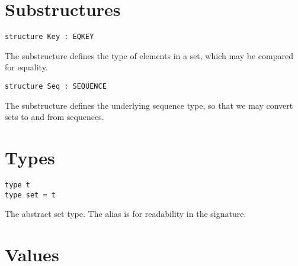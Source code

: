 \section{Substructures}
\label{sec:set-interface::substructures}

\begin{cluster}
\label{grp:grm:set-interface::structure}

\begin{gram}
\label{grm:set-interface::structure}
\begin{verbatim}
structure Key : EQKEY
\end{verbatim}
The  substructure defines the type of elements in a set, which may be
compared for equality.

\end{gram}
\end{cluster}

\begin{cluster}
\label{grp:grm:set-interface::sequence}

\begin{gram}
\label{grm:set-interface::sequence}
\begin{verbatim}
structure Seq : SEQUENCE
\end{verbatim}
The  substructure defines the underlying sequence type, so that we
may convert sets to and from sequences.

\end{gram}
\end{cluster}


\section{Types}
\label{sec:set-interface::types}

\begin{cluster}
\label{grp:grm:set-interface::type}

\begin{gram}
\label{grm:set-interface::type}
\begin{verbatim}
type t
type set = t
\end{verbatim}
The abstract set type. The alias  is for readability in the
signature.

\end{gram}
\end{cluster}


\section{Values}
\label{sec:set-interface::values}


